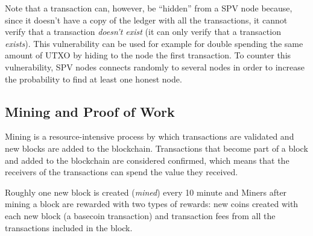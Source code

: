 Note that a transaction can, however, be ``hidden'' from a SPV node because, since
it doesn't have a copy of the ledger with all the transactions, it cannot verify
that a transaction \emph{doesn't exist} (it can only verify that a transaction
\emph{exists}). This vulnerability can be used for example for double spending
the same amount of UTXO by hiding to the node the first transaction. To counter
this vulnerability, SPV nodes connects randomly to several nodes in order to
increase the probability to find at least one honest node.











\subsection{Mining and Proof of Work} Mining is a resource-intensive
process by which transactions are validated and new blocks are added to the
blockchain. Transactions that become part of a block and added to the blockchain
are considered confirmed, which means that the receivers of the transactions can
spend the value they received.

Roughly one new block is created (\emph{mined}) every 10 minute and Miners after
mining a block are rewarded with two types of rewards: new coins created with
each new block (a basecoin transaction) and transaction fees from all the
transactions included in the block.

